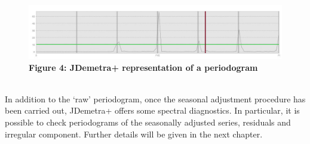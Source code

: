 \documentclass{article}
\begin{document}
\begin{figure}[h!]
\includegraphics[width=\linewidth]{../images/capitolo2/raw.jpg}
\centering
{\textbf{\scriptsize Figure 4: JDemetra+ representation of a periodogram}}
\end{figure}
\\In addition to the ‘raw’ periodogram, once the seasonal adjustment procedure has been carried out, JDemetra+ offers some spectral diagnostics. In particular, it is possible to check periodograms of the seasonally adjusted series, residuals and irregular component. Further details will be given in the next chapter.
\end{document}
